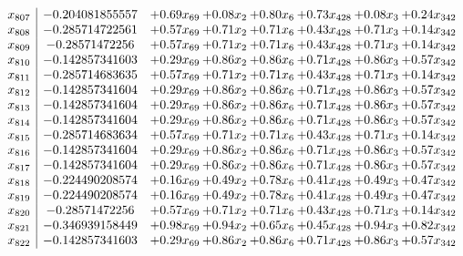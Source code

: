 \documentclass[8pt]{article}
\begin{document}
\[\begin{array}{c| c c@{\hskip 2pt} c@{\hskip 2pt} c@{\hskip 2pt} c@{\hskip 2pt} c@{\hskip 2pt} c@{\hskip 2pt} }
 x_{807}   &  -0.204081855557 & +  0.69 x_{69} & +  0.08 x_{2} & +  0.80 x_{6} & +  0.73 x_{428} & +  0.08 x_{3} & +  0.24 x_{342}\\
 x_{808}   &  -0.285714722561 & +  0.57 x_{69} & +  0.71 x_{2} & +  0.71 x_{6} & +  0.43 x_{428} & +  0.71 x_{3} & +  0.14 x_{342}\\
 x_{809}   &  -0.28571472256 & +  0.57 x_{69} & +  0.71 x_{2} & +  0.71 x_{6} & +  0.43 x_{428} & +  0.71 x_{3} & +  0.14 x_{342}\\
 x_{810}   &  -0.142857341603 & +  0.29 x_{69} & +  0.86 x_{2} & +  0.86 x_{6} & +  0.71 x_{428} & +  0.86 x_{3} & +  0.57 x_{342}\\
 x_{811}   &  -0.285714683635 & +  0.57 x_{69} & +  0.71 x_{2} & +  0.71 x_{6} & +  0.43 x_{428} & +  0.71 x_{3} & +  0.14 x_{342}\\
 x_{812}   &  -0.142857341604 & +  0.29 x_{69} & +  0.86 x_{2} & +  0.86 x_{6} & +  0.71 x_{428} & +  0.86 x_{3} & +  0.57 x_{342}\\
 x_{813}   &  -0.142857341604 & +  0.29 x_{69} & +  0.86 x_{2} & +  0.86 x_{6} & +  0.71 x_{428} & +  0.86 x_{3} & +  0.57 x_{342}\\
 x_{814}   &  -0.142857341604 & +  0.29 x_{69} & +  0.86 x_{2} & +  0.86 x_{6} & +  0.71 x_{428} & +  0.86 x_{3} & +  0.57 x_{342}\\
 x_{815}   &  -0.285714683634 & +  0.57 x_{69} & +  0.71 x_{2} & +  0.71 x_{6} & +  0.43 x_{428} & +  0.71 x_{3} & +  0.14 x_{342}\\
 x_{816}   &  -0.142857341604 & +  0.29 x_{69} & +  0.86 x_{2} & +  0.86 x_{6} & +  0.71 x_{428} & +  0.86 x_{3} & +  0.57 x_{342}\\
 x_{817}   &  -0.142857341604 & +  0.29 x_{69} & +  0.86 x_{2} & +  0.86 x_{6} & +  0.71 x_{428} & +  0.86 x_{3} & +  0.57 x_{342}\\
 x_{818}   &  -0.224490208574 & +  0.16 x_{69} & +  0.49 x_{2} & +  0.78 x_{6} & +  0.41 x_{428} & +  0.49 x_{3} & +  0.47 x_{342}\\
 x_{819}   &  -0.224490208574 & +  0.16 x_{69} & +  0.49 x_{2} & +  0.78 x_{6} & +  0.41 x_{428} & +  0.49 x_{3} & +  0.47 x_{342}\\
 x_{820}   &  -0.28571472256 & +  0.57 x_{69} & +  0.71 x_{2} & +  0.71 x_{6} & +  0.43 x_{428} & +  0.71 x_{3} & +  0.14 x_{342}\\
 x_{821}   &  -0.346939158449 & +  0.98 x_{69} & +  0.94 x_{2} & +  0.65 x_{6} & +  0.45 x_{428} & +  0.94 x_{3} & +  0.82 x_{342}\\
 x_{822}   &  -0.142857341603 & +  0.29 x_{69} & +  0.86 x_{2} & +  0.86 x_{6} & +  0.71 x_{428} & +  0.86 x_{3} & +  0.57 x_{342}\\

\end{array}\]
\end{document}

